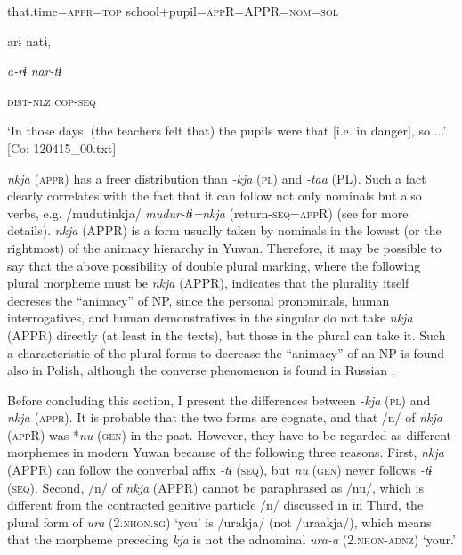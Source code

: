 \begin{table}
    that.time=\textsc{appr}=\textsc{top}  school+pupil=\textsc{app}R=APPR=\textsc{nom}=\textsc{sol}

    arɨ  natɨ,

    \textit{a-rɨ}  \textit{nar-tɨ}

    \textsc{dist}-\textsc{nlz}  \textsc{cop}-\textsc{seq}

\glt    ‘In those days, (the teachers felt that) the pupils were that [i.e. in danger], so ...’ [Co: 120415\_00.txt]
\z

\textit{nkja} (\textsc{appr}) has a freer distribution than \textit{-kja} (\textsc{pl}) and \textit{-taa} (PL). Such a fact clearly correlates with the fact that it can follow not only nominals but also verbs, e.g. /mudutɨnkja/ \textit{mudur-tɨ=nkja} (return-\textsc{seq}=\textsc{app}R) (see for more details). \textit{nkja} (APPR) is a form usually taken by nominals in the lowest (or the rightmost) of the animacy hierarchy in Yuwan. Therefore, it may be possible to say that the above possibility of double plural marking, where the following plural morpheme must be \textit{nkja} (APPR), indicates that the plurality itself decreses the “animacy” of NP, since the personal pronominals, human interrogatives, and human demonstratives in the singular do not take \textit{nkja} (APPR) directly (at least in the texts), but those in the plural can take it. Such a characteristic of the plural forms to decrease the “animacy” of an NP is found also in Polish, although the converse phenomenon is found in Russian \citep[188]{Comrie1989}.

  Before concluding this section, I present the differences between \textit{-kja} (\textsc{pl}) and \textit{nkja} (\textsc{appr}). It is probable that the two forms are cognate, and that /n/ of \textit{nkja} (\textsc{app}R) was *\textit{nu} (\textsc{gen}) in the past. However, they have to be regarded as different morphemes in modern Yuwan because of the following three reasons. First, \textit{nkja} (APPR) can follow the converbal affix \textit{-tɨ} (\textsc{seq}), but \textit{nu} (\textsc{gen}) never follows \textit{-tɨ} (\textsc{seq}). Second, /n/ of \textit{nkja} (APPR) cannot be paraphrased as /nu/, which is different from the contracted genitive particle /n/ discussed in  in  Third, the plural form of \textit{ura} (2.\textsc{nhon}.\textsc{sg}) ‘you’ is /urakja/ (not /uraakja/), which means that the morpheme preceding \textit{kja} is not the adnominal \textit{ura-a} (2.\textsc{nhon}-\textsc{adnz}) ‘your.’


\end{table}
